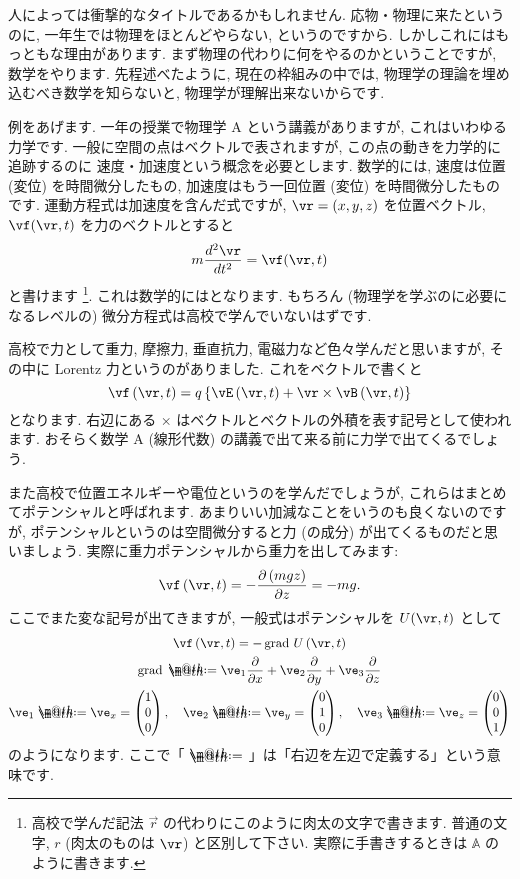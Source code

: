 \documentclass[openany, a4paper, oneside]{jsbook}
\makeatletter
\newcommand*{\defeq}{\mathrel{\rlap{%
\raisebox{0.3ex}{$\m@th\cdot$}}%
\raisebox{-0.3ex}{$\m@th\cdot$}}%
=}
\DeclareMathOperator{\grad}{grad \,}
\theoremstyle{break}
\theoremstyle{breakdefn}
\newcommand{\rbk}[1]{\left (#1\right)}
\newcommand{\cbk}[1]{\left\{#1\right\}}
\newcommand{\bbA}{\mathbb{A}}
\newcommand{\vecc}[3]{\begin{pmatrix}#1\\#2\\#3\end{pmatrix}}
\newcommand{\pd}{\partial}
\makeatother
\begin{document}
人によっては衝撃的なタイトルであるかもしれません.
応物・物理に来たというのに, 一年生では物理をほとんどやらない, というのですから.
しかしこれにはもっともな理由があります.
まず物理の代わりに何をやるのかということですが, 数学をやります.
先程述べたように, 現在の枠組みの中では,
物理学の理論を埋め込むべき数学を知らないと, 物理学が理解出来ないからです.

例をあげます.
一年の授業で物理学 A という講義がありますが, これはいわゆる力学です.
一般に空間の点はベクトルで表されますが, この点の動きを力学的に追跡するのに
速度・加速度という概念を必要とします.
数学的には, 速度は位置 (変位) を時間微分したもの,
加速度はもう一回位置 (変位) を時間微分したものです.
運動方程式は加速度を含んだ式ですが,
$\vr = (x, y, z)$ を位置ベクトル,
$\vf (\vr, t)$ を力のベクトルとすると
\begin{equation}
 m\frac{d^{2}\vr}{dt^{2}}=\vf (\vr, t)
\end{equation}
と書けます \footnote{高校で学んだ記法 $\vec{r}$ の代わりにこのように肉太の文字で書きます.
普通の文字, $r$ (肉太のものは $\vr$) と区別して下さい.
実際に手書きするときは $\bbA$ のように書きます.
 }.
これは数学的にはとなります.
もちろん (物理学を学ぶのに必要になるレベルの) 微分方程式は高校で学んでいないはずです.

高校で力として重力, 摩擦力, 垂直抗力, 電磁力など色々学んだと思いますが,
その中に Lorentz 力というのがありました.
これをベクトルで書くと
\begin{equation}
 \vf \rbk{\vr,t } = q \cbk{ \vE  \rbk{ \vr ,t } + \vr \times \vB \rbk{\vr,t } }
\end{equation}
となります.
右辺にある $\times$ はベクトルとベクトルの外積を表す記号として使われます.
おそらく数学 A (線形代数) の講義で出て来る前に力学で出てくるでしょう.

また高校で位置エネルギーや電位というのを学んだでしょうが,
これらはまとめてポテンシャルと呼ばれます.
あまりいい加減なことをいうのも良くないのですが,
ポテンシャルというのは空間微分すると力 (の成分) が出てくるものだと思いましょう.
実際に重力ポテンシャルから重力を出してみます:
\begin{equation}
 \vf \rbk{ \vr,t } = - \frac{ \pd \rbk{ mgz }}{ \pd z} = -mg.
\end{equation}
ここでまた変な記号が出てきますが, 一般式はポテンシャルを $U ( \vr,t)$ として
\begin{gather}
 \vf \rbk{ \vr,t }
 =
 -\grad U \rbk{ \vr,t } \\
 \grad
 \defeq
 \ve_{1} \frac{ \pd }{\pd x} + \ve_{2} \frac{ \pd }{\pd y}
        +\ve_{3} \frac{ \pd }{\pd z} \\
 \ve_{1}
 \defeq
 \ve_{x}
 =
 \vecc{1}{0}{0}
 , \quad
 \ve_{2}
 \defeq
 \ve_{y}
 =
 \vecc{0}{1}{0}, \quad \ve_3
 \defeq
 \ve_{z}
 =
 \vecc{0}{0}{1}
\end{gather}
のようになります.
ここで「 $\defeq$ 」は「右辺を左辺で定義する」という意味です.
\end{document}
